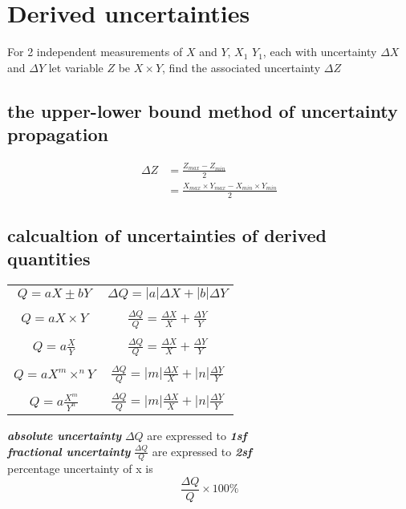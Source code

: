 \documentclass[a4paper, 10pt]{article}
\begin{document}
\section{Derived uncertainties}
For 2 independent measurements of $X$ and $Y$, $X_1$ $Y_1$, each with uncertainty $\Delta X$ and $\Delta Y$  let variable $Z$ be $X \times Y$, find the associated uncertainty $\Delta Z$ 
\subsection{the upper-lower bound method of uncertainty propagation}
\begin{align*}
   \Delta Z &= \frac{Z_{max} - Z_{min}}{2} \\
            &= \frac{X_{max} \times Y_{max} - X_{min} \times Y_{min}}{2}
\end{align*}	

\subsection{calcualtion of uncertainties of derived quantities}
\begin{center}
   \begin{tabular}{c|c}
      $Q = aX \pm bY$ & $\Delta Q = |a|\Delta X + |b| \Delta Y$ \\ \\
      $Q = aX \times Y$ & $\frac{\Delta Q}{Q} = \frac{\Delta X}{X} + \frac{\Delta Y}{Y} $  \\ \\
      $Q = a\frac{X}{Y}$ & $\frac{\Delta Q}{Q} = \frac{\Delta X}{X} + \frac{\Delta Y}{Y} $  \\ \\
      $Q = aX^m \times ^nY$ & $\frac{\Delta Q}{Q} = |m|\frac{\Delta X}{X} + |n|\frac{\Delta Y}{Y} $  \\ \\
      $Q = a\frac{X^m}{Y^n}$ & $\frac{\Delta Q}{Q} = |m|\frac{\Delta X}{X} + |n|\frac{\Delta Y}{Y} $
   \end{tabular}
\end{center}

\textbf{\textit{absolute uncertainty}} $\Delta Q$ are expressed to \textbf{\textit{1sf}} \\

\textbf{\textit{fractional uncertainty}} $\frac{\Delta Q}{Q}$ are expressed to \textbf{\textit{2sf}} \\

percentage uncertainty of x is 
\[
   \frac{\Delta Q}{Q} \times 100\%
\]
\end{document}
